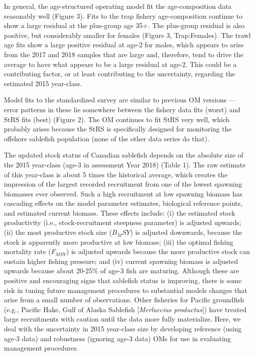 \documentclass[11pt]{book}
\begin{document}
In general, the age-structured operating model fit the age-composition data reasonably well (Figure 3). Fits to the trap fishery age-composition continue to show a large residual at the plus-group age 35+. The plus-group residual is also positive, but considerably smaller for females (Figure 3, Trap:Females). The trawl age fits show a large positive residual at age-2 for males, which appears to arise from the 2017 and 2018 samples that are large and, therefore, tend to drive the average to have what appears to be a large residual at age-2. This could be a contributing factor, or at least contributing to the uncertainty, regarding the estimated 2015 year-class.

Model fits to the standardized survey are similar to previous OM versions --- error patterns in these lie somewhere between the fishery data fits (worst) and StRS fits (best) (Figure 2). The OM continues to fit StRS very well, which probably arises because the StRS is specifically designed for monitoring the offshore sablefish population (none of the other data series do that).

The updated stock status of Canadian sablefish depends on the absolute size of the 2015 year-class (age-3 in assessment Year 2018) (Table 1). The raw estimate of this year-class is about 5 times the historical average, which creates the impression of the largest recorded recruitment from one of the lowest spawning biomasses ever observed. Such a high recruitment at low spawning biomass has cascading effects on the model parameter estimates, biological reference points, and estimated current biomass. These effects include: (i) the estimated stock productivity (i.e., stock-recruitment steepness parameter) is adjusted upwards; (ii) the most productive stock size (\(B_MSY\)) is adjusted downwards, because the stock is apparently more productive at low biomass; (iii) the optimal fishing mortality rate (\(F_{MSY}\)) is adjusted upwards because the more productive stock can sustain higher fishing pressure; and (iv) current spawning biomass is adjusted upwards because about 20-25\% of age-3 fish are maturing. Although these are positive and encouraging signs that sablefish status is improving, there is some risk in tuning future management procedures to substantial models changes that arise from a small number of observations. Other fisheries for Pacific groundfish (e.g., Pacific Hake, Gulf of Alaska Sablefish {[}\emph{Merluccius productus}{]}) have treated large recruitments with caution until the data more fully materialize. Here, we deal with the uncertainty in 2015 year-class size by developing reference (using age-3 data) and robustness (ignoring age-3 data) OMs for use in evaluating management procedures.
\end{document}

